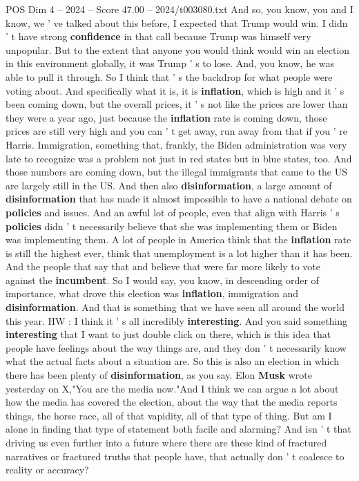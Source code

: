 \begin{textsample}{POS Dim 4 – 2024 – Score 47.00 – 2024/t003080.txt}
And so, you know, you and I know, we ' ve talked about this before, I expected that Trump would win.
I didn ' t have strong \textbf{confidence} in that call because Trump was himself very unpopular.
But to the extent that anyone you would think would win an election in this environment globally, it was Trump ' s to lose.
And, you know, he was able to pull it through.
So I think that ' s the backdrop for what people were voting about.
And specifically what it is, it is \textbf{inflation}, which is high and it ' s been coming down, but the overall prices, it ' s not like the prices are lower than they were a year ago, just because the \textbf{inflation} rate is coming down, those prices are still very high and you can ' t get away, run away from that if you ' re Harris.
Immigration, something that, frankly, the Biden administration was very late to recognize was a problem not just in red states but in blue states, too.
And those numbers are coming down, but the illegal immigrants that came to the US are largely still in the US.
And then also \textbf{disinformation}, a large amount of \textbf{disinformation} that has made it almost impossible to have a national debate on \textbf{policies} and issues.
And an awful lot of people, even that align with Harris ' s \textbf{policies} didn ' t necessarily believe that she was implementing them or Biden was implementing them.
A lot of people in America think that the \textbf{inflation} rate is still the highest ever, think that unemployment is a lot higher than it has been.
And the people that say that and believe that were far more likely to vote against the \textbf{incumbent}.
So I would say, you know, in descending order of importance, what drove this election was \textbf{inflation}, immigration and \textbf{disinformation}.
And that is something that we have seen all around the world this year.
HW : I think it ' s all incredibly \textbf{interesting}.
And you said something \textbf{interesting} that I want to just double click on there, which is this idea that people have feelings about the way things are, and they don ' t necessarily know what the actual facts about a situation are.
So this is also an election in which there has been plenty of \textbf{disinformation}, as you say.
Elon \textbf{Musk} wrote yesterday on X,"You are the media now."And I think we can argue a lot about how the media has covered the election, about the way that the media reports things, the horse race, all of that vapidity, all of that type of thing.
But am I alone in finding that type of statement both facile and alarming?
And isn ' t that driving us even further into a future where there are these kind of fractured narratives or fractured truths that people have, that actually don ' t coalesce to reality or accuracy?

\end{textsample}
